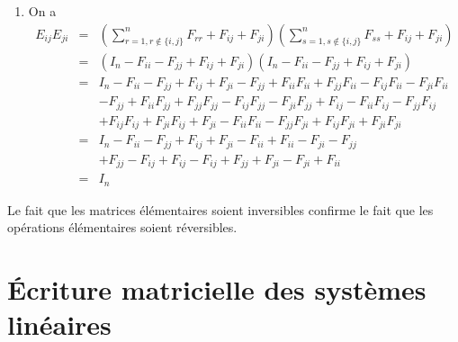 {\begin{enumerate}
    \item On a
      \begin{eqnarray*}
        E_{i j}E_{j i} 
          &=& \left( \sum_{r = 1, r \notin \{i, j\}}^{n} F_{r r} + F_{i j} + F_{j i}\right) \left( \sum_{s = 1, s \notin \{i, j\}}^{n} F_{s s}+F_{i j}+F_{j i} \right) \\
          &=& (I_n - F_{i i} - F_{j j} + F_{i j} + F_{j i}) (I_n - F_{i i} - F_{j j} + F_{i j} + F_{j i}) \\
          &=& I_n - F_{i i} - F_{j j} + F_{i j} + F_{j i} - F_{j j} + F_{i i} F_{i i} + F_{j j} F_{i i} - F_{i j} F_{i i} - F_{j i} F_{i i} \\
            && - F_{j j} + F_{i i} F_{j j} + F_{j j} F_{j j} - F_{i j} F_{j j} - F_{j i} F_{j j} + F_{i j} - F_{i i} F_{i j} - F_{j j} F_{i j} \\
            && + F_{i j} F_{i j} + F_{j i} F_{i j} + F_{j i} - F_{i i} F_{i i} - F_{j j} F_{j i} + F_{i j} F_{j i} + F_{j i} F_{j i}\\
          &=& I_n - F_{i i} - F_{j j} + F_{i j} + F_{j i} - F_{i i} + F_{i i} - F_{j i} - F_{j j} \\
            && + F_{j j} - F_{i j} + F_{i j} - F_{i j} + F_{j j} + F_{j i} - F_{j i} + F_{i i} \\
          &=& I_n
      \end{eqnarray*}
  \end{enumerate}
}
Le fait que les matrices élémentaires soient inversibles confirme le fait que les opérations élémentaires soient réversibles.

%
%
\section{Écriture matricielle des systèmes linéaires}
%
%
